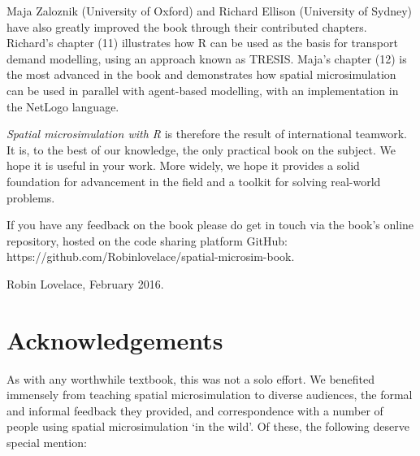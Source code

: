 Maja Zaloznik
(University of Oxford)
and Richard Ellison (University of Sydney) have also greatly improved the book
through their contributed chapters.
Richard's chapter (11) illustrates how R can be used as the basis for transport
demand modelling, using an approach known as TRESIS. Maja's chapter (12)
is the most advanced in the book and demonstrates how spatial microsimulation
can be used in parallel with agent-based modelling, with an implementation in the
NetLogo language.



\emph{Spatial microsimulation with R} is therefore the
result of international teamwork.
It is, to the best of our knowledge, the only practical book on the subject.
We hope it is useful in your work.
More widely, we hope it provides
a solid foundation for advancement in the
field and a toolkit for solving real-world problems.

If you have any feedback on the book please do get in touch via the book's online repository, hosted on the code sharing platform GitHub: https://github.com/Robinlovelace/spatial-microsim-book.

Robin Lovelace, February 2016.




 \section{Acknowledgements}
 
 As with any worthwhile textbook, this was not a solo effort. We benefited
 immensely from teaching spatial microsimulation to diverse audiences, the
 formal and informal feedback they provided, and correspondence with a number
 of people using spatial microsimulation `in the wild'. Of these,
 the following deserve special mention:
 
